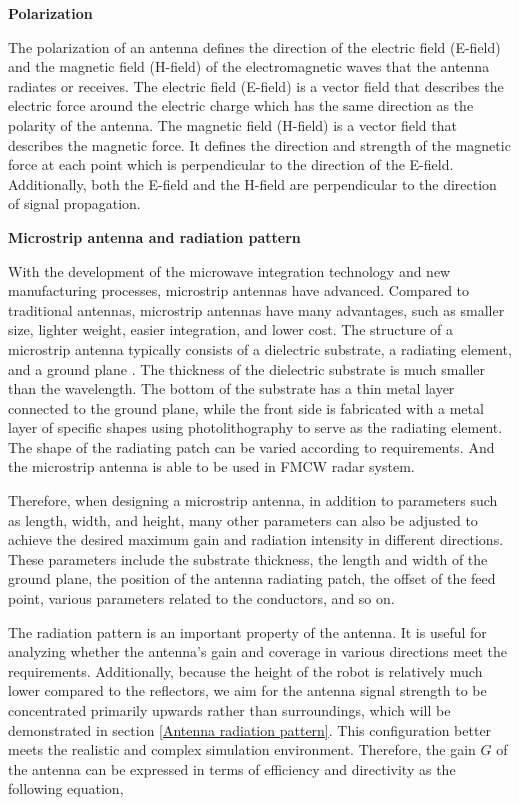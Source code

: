 \documentclass[12pt,DIV14,BCOR12mm,a4paper,footinclude=false,headinclude,parskip=half-,twoside,openright,cleardoublepage=empty,toc=index,bibliography=totoc,listof=totoc]{scrreprt}
\numberwithin{equation}{chapter}
\begin{document}
\begin{spacing}{1.5}
\textbf{\large{Polarization}}
\end{spacing}

The polarization of an antenna defines the direction of the electric field (E-field) and the magnetic field (H-field) of the electromagnetic waves that the antenna radiates or receives. The electric field (E-field) is a vector field that describes the electric force around the electric charge which has the same direction as the polarity of the antenna. The magnetic field (H-field) is a vector field that describes the magnetic force. It defines the direction and strength of the magnetic force at each point which is perpendicular to the direction of the E-field. Additionally, both the E-field and the H-field are perpendicular to the direction of signal propagation.

\begin{spacing}{1.5}
\textbf{\large{Microstrip antenna and radiation pattern}}
\end{spacing}

With the development of the microwave integration technology and new manufacturing processes, microstrip antennas have advanced. Compared to traditional antennas, microstrip antennas have many advantages, such as smaller size, lighter weight, easier integration, and lower cost. The structure of a microstrip antenna typically consists of a dielectric substrate, a radiating element, and a ground plane \cite{patchMicrostrip}. The thickness of the dielectric substrate is much smaller than the wavelength. The bottom of the substrate has a thin metal layer connected to the ground plane, while the front side is fabricated with a metal layer of specific shapes using photolithography to serve as the radiating element. The shape of the radiating patch can be varied according to requirements. And the microstrip antenna is able to be used in FMCW radar system.

Therefore, when designing a microstrip antenna, in addition to parameters such as length, width, and height, many other parameters can also be adjusted to achieve the desired maximum gain and radiation intensity in different directions. These parameters include the substrate thickness, the length and width of the ground plane, the position of the antenna radiating patch, the offset of the feed point, various parameters related to the conductors, and so on.

The radiation pattern is an important property of the antenna. It is useful for analyzing whether the antenna’s gain and coverage in various directions meet the requirements. Additionally, because the height of the robot is relatively much lower compared to the reflectors, we aim for the antenna signal strength to be concentrated primarily upwards rather than surroundings, which will be demonstrated in section \ref{Antenna radiation pattern}. This configuration better meets the realistic and complex simulation environment. Therefore, the gain $G$ of the antenna can be expressed in terms of efficiency and directivity as the following equation,
\end{document}
